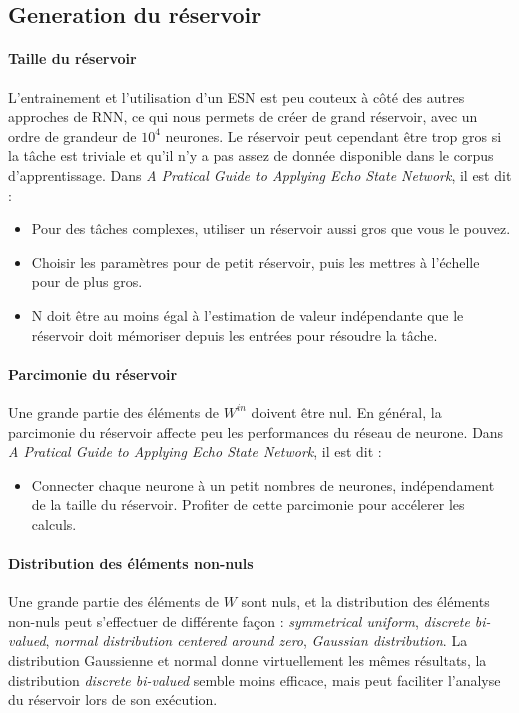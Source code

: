 \documentclass[12pt]{article}
\begin{document}
\subsection{Generation du réservoir}
\paragraph{Taille du réservoir}
L'entrainement et l'utilisation d'un ESN est peu couteux à côté des autres approches de RNN, ce qui nous permets de créer de grand réservoir, avec un ordre de grandeur de $10^{4}$ neurones. Le réservoir peut cependant être trop gros si la tâche est triviale et qu'il n'y a pas assez de donnée disponible dans le corpus d'apprentissage.\newline
Dans \textit{A Pratical Guide to Applying Echo State Network}, il est dit :
\begin{itemize}
\item Pour des tâches complexes, utiliser un réservoir aussi gros que vous le pouvez.
\item Choisir les paramètres pour de petit réservoir, puis les mettres à l'échelle pour de plus gros.
\item N doit être au moins égal à l'estimation de valeur indépendante que le réservoir doit mémoriser depuis les entrées pour résoudre la tâche.
\end{itemize}

\paragraph{Parcimonie du réservoir}
Une grande partie des éléments de $W^{in}$ doivent être nul. En général, la parcimonie du réservoir affecte peu les performances du réseau de neurone.\newline
Dans \textit{A Pratical Guide to Applying Echo State Network}, il est dit :
\begin{itemize}
\item Connecter chaque neurone à un petit nombres de neurones, indépendament de la taille du réservoir. Profiter de cette parcimonie pour accélerer les calculs.
\end{itemize}

\paragraph{Distribution des éléments non-nuls}
Une grande partie des éléments de $W$ sont nuls, et la distribution des éléments non-nuls peut s'effectuer de différente façon : \textit{symmetrical uniform}, \textit{discrete bi-valued}, \textit{normal distribution centered around zero}, \textit{Gaussian distribution}.\newline
La distribution Gaussienne et normal donne virtuellement les mêmes résultats, la distribution \textit{discrete bi-valued} semble moins efficace, mais peut faciliter l'analyse du réservoir lors de son exécution.
\end{document}
